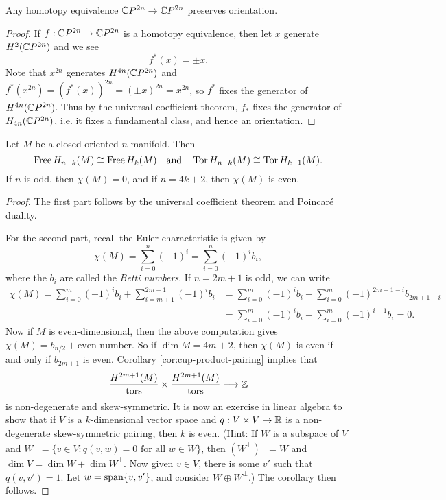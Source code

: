 \begin{corollary}
  Any homotopy equivalence $\mathbb{C} P^{2n} \to \mathbb{C} P^{2n}$
  preserves orientation.
\end{corollary}

\begin{proof}
  If $f : \mathbb{C} P^{2n} \to \mathbb{C} P^{2n}$ is a
  homotopy equivalence, then let
  $x$ generate $H^2(\mathbb{C} P^{2n})$ and we see
  \[
    f^*(x) = \pm x.
  \]
  Note that $x^{2n}$ generates $H^{4n}(\mathbb{C} P^{2n})$
  and $f^*(x^{2n}) = (f^*(x))^{2n} = (\pm x)^{2n} = x^{2n}$,
  so $f^*$ fixes the generator of $H^{4n}(\mathbb{C} P^{2n})$.
  Thus by the universal coefficient theorem,
  $f_*$ fixes the generator of $H_{4n}(\mathbb{C} P^{2n})$, i.e.
  it fixes a fundamental class, and hence
  an orientation.
\end{proof}

\begin{corollary}\label{cor:even}
  Let $M$ be a closed oriented $n$-manifold.
  Then
  \[
    \operatorname{Free} H_{n - k}(M) \cong \operatorname{Free} H_k(M) \quad
    \text{and} \quad \operatorname{Tor} H_{n - k}(M) \cong \operatorname{Tor} H_{k - 1}(M).
  \]
  If $n$ is odd, then $\chi(M) = 0$, and
  if $n = 4k + 2$, then $\chi(M)$ is even.
\end{corollary}

\begin{proof}
  The first part follows by the universal
  coefficient theorem and Poincar\'e duality.

  For the second part, recall the Euler
  characteristic is given by
  \[
    \chi(M)
    = \sum_{i = 0}^{n} (-1)^i
    = \sum_{i = 0}^{n} (-1)^i b_i,
  \]
  where the $b_i$ are called the \emph{Betti numbers}.
  If $n = 2m + 1$ is odd, we can write
  \begin{align*}
    \chi(M)
    = \sum_{i = 0}^m (-1)^i b_i
    + \sum_{i = m + 1}^{2m + 1} (-1)^i b_i
    &= \sum_{i = 0}^m (-1)^i b_i
    + \sum_{i = 0}^m (-1)^{2m + 1 - i} b_{2m + 1 - i} \\
    &= \sum_{i = 0}^m (-1)^i b_i
    + \sum_{i = 0}^m (-1)^{i + 1} b_i
    = 0.
  \end{align*}
  Now if $M$ is even-dimensional, then
  the above computation gives $\chi(M) = b_{n / 2} + \text{even number}$.
  So if $\dim M = 4m + 2$, then
  $\chi(M)$ is even if and only if
  $b_{2m + 1}$ is even. Corollary \ref{cor:cup-product-pairing}
  implies that
  \[
    \frac{H^{2m + 1}(M)}{\mathrm{tors}} \times
    \frac{H^{2m + 1}(M)}{\mathrm{tors}} \longrightarrow
    \mathbb{Z}
  \]
  is non-degenerate and skew-symmetric. It
  is now an exercise in linear algebra to
  show that if
  $V$ is a $k$-dimensional vector space
  and $q : V \times V \to \mathbb{R}$ is a
  non-degenerate
  skew-symmetric pairing, then $k$ is even.
  (Hint: If $W$ is a subspace of $V$ and
  $W^\perp = \{v \in V : q(v, w) = 0 \text{ for all } w \in W\}$, then
  $(W^\perp)^\perp = W$ and
  $\dim V = \dim W + \dim W^\perp$. Now given
  $v \in V$, there is some $v'$ such that
  $q(v, v') = 1$. Let $w = \operatorname{span}\{v, v'\}$, and
  consider $W \oplus W^\perp$.)
  The corollary then follows.
\end{proof}

